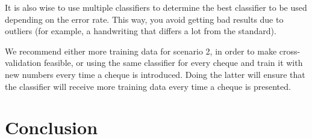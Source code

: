 \documentclass[11pt,twoside,a4paper]{article}
\begin{document}
It is also wise to use multiple classifiers to determine the best classifier to be used depending on the error rate. This way, you avoid getting bad results due to outliers (for example, a handwriting that differs a lot from the standard).

We recommend either more training data for scenario 2, in order to make cross-validation feasible, or using the same classifier for every cheque and train it with new numbers every time a cheque is introduced. Doing the latter will ensure that the classifier will receive more training data every time a cheque is presented.

\section{Conclusion}

\newpage


\end{document}
